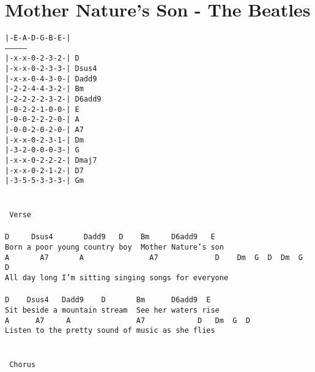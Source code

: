 \newpage
\section{Mother Nature's Son - The Beatles}
\label{Mother Nature's Son - The Beatles}
\texttt{|-E-A-D-G-B-E-|\\
---------------\\
|-x-x-0-2-3-2-|  D\ \\
|-x-x-0-2-3-3-|  Dsus4\ \\
|-x-x-0-4-3-0-|  Dadd9\ \\
|-2-2-4-4-3-2-|  Bm\ \\
|-2-2-2-2-3-2-|  D6add9\ \\
|-0-2-2-1-0-0-|  E\ \\
|-0-0-2-2-2-0-|  A\ \\
|-0-0-2-0-2-0-|  A7\ \\
|-x-x-0-2-3-1-|  Dm\ \\
|-3-2-0-0-0-3-|  G\ \\
|-x-x-0-2-2-2-|  Dmaj7\ \\
|-x-x-0-2-1-2-|  D7\ \\
|-3-5-5-3-3-3-|  Gm\ \\
\\
\\
\lbrack\ Verse\rbrack\\
\\
D\ \ \ \ \ Dsus4\ \ \ \ \ \ \ Dadd9\ \ \ D\ \ \ \ Bm\ \ \ \ \ D6add9\ \ \ E\\
Born\ a\ poor\ young\ country\ boy\ \ Mother\ Nature's\ son\\
A\ \ \ \ \ \ \ A7\ \ \ \ \ \ \ A\ \ \ \ \ \ \ \ \ \ \ \ \ \ \ A7\ \ \ \ \ \ \ \ \ \ \ \ \ D\ \ \ \ Dm\ \ G\ \ D\ \ Dm\ \ G\ \ D\\
All\ day\ long\ I'm\ sitting\ singing\ songs\ for\ everyone\\
\\
D\ \ \ \ Dsus4\ \ \ Dadd9\ \ \ \ D\ \ \ \ \ \ \ Bm\ \ \ \ \ \ D6add9\ \ E\ \\
Sit\ beside\ a\ mountain\ stream\ \ See\ her\ waters\ rise\\
A\ \ \ \ \ \ A7\ \ \ \ \ A\ \ \ \ \ \ \ \ \ \ \ \ \ \ \ A7\ \ \ \ \ \ \ \ \ \ \ \ D\ \ \ Dm\ \ G\ \ D\ \\
Listen\ to\ the\ pretty\ sound\ of\ music\ as\ she\ flies\\
\\
\\
\lbrack\ Chorus\rbrack\\
\\
}
